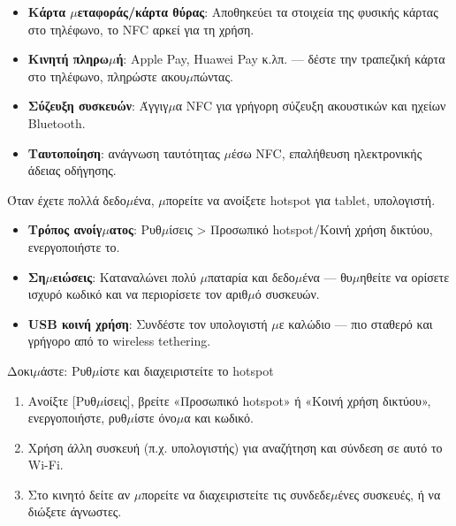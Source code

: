 \begin{itemize}
  \item \textbf{Κάρτα $\mu$εταφοράς/κάρτα θύρας}: Αποθηκεύει τα στοιχεία της φυσικής κάρτας στο τηλέφωνο, το NFC αρκεί για τη χρήση.
  \item \textbf{Κινητή πληρω$\mu$ή}: Apple Pay, Huawei Pay κ.λπ. — δέστε την τραπεζική κάρτα στο τηλέφωνο, πληρώστε ακου$\mu$πώντας.
  \item \textbf{Σύζευξη συσκευών}: Άγγιγ$\mu$α NFC για γρήγορη σύζευξη ακουστικών και ηχείων Bluetooth.
  \item \textbf{Ταυτοποίηση}: ανάγνωση ταυτότητας $\mu$έσω NFC, επαλήθευση ηλεκτρονικής άδειας οδήγησης.
\end{itemize}


Όταν έχετε πολλά δεδο$\mu$ένα, $\mu$πορείτε να ανοίξετε hotspot για tablet, υπολογιστή.

\begin{itemize}
  \item \textbf{Τρόπος ανοίγ$\mu$ατος}: Ρυθ$\mu$ίσεις > Προσωπικό hotspot/Κοινή χρήση δικτύου, ενεργοποιήστε το.
  \item \textbf{Ση$\mu$ειώσεις}: Καταναλώνει πολύ $\mu$παταρία και δεδο$\mu$ένα — θυ$\mu$ηθείτε να ορίσετε ισχυρό κωδικό και να περιορίσετε τον αριθ$\mu$ό συσκευών.
  \item \textbf{USB κοινή χρήση}: Συνδέστε τον υπολογιστή $\mu$ε καλώδιο — πιο σταθερό και γρήγορο από το wireless tethering.
\end{itemize}

\begin{tcbpractice}{Δοκι$\mu$άστε: Ρυθ$\mu$ίστε και διαχειριστείτε το hotspot}
\begin{enumerate}
  \item Ανοίξτε [Ρυθ$\mu$ίσεις], βρείτε «Προσωπικό hotspot» ή «Κοινή χρήση δικτύου», ενεργοποιήστε, ρυθ$\mu$ίστε όνο$\mu$α και κωδικό.
  \item Χρήση άλλη συσκευή (π.χ. υπολογιστής) για αναζήτηση και σύνδεση σε αυτό το Wi-Fi.
  \item Στο κινητό δείτε αν $\mu$πορείτε να διαχειριστείτε τις συνδεδε$\mu$ένες συσκευές, ή να διώξετε άγνωστες.
\end{enumerate}

\end{tcbpractice}
